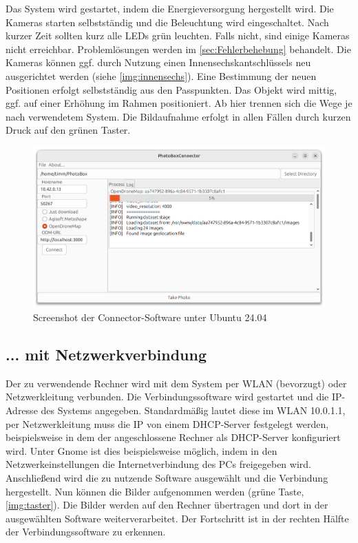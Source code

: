 \documentclass[./00PhotoBox.tex]{subfiles}
\begin{document}
Das System wird gestartet, indem die Energieversorgung hergestellt wird. Die Kameras starten selbstständig und die Beleuchtung wird eingeschaltet. Nach kurzer Zeit sollten kurz alle LEDs grün leuchten. Falls nicht, sind einige Kameras nicht erreichbar. Problemlösungen werden im \autoref{sec:Fehlerbehebung} behandelt. Die Kameras können ggf. durch Nutzung einen Innensechskantschlüssels neu ausgerichtet werden (siehe \autoref{img:innensechs}). Eine Bestimmung der neuen Positionen erfolgt selbstständig aus den Passpunkten. Das Objekt wird mittig, ggf. auf einer Erhöhung im Rahmen positioniert. Ab hier trennen sich die Wege je nach verwendetem System. Die Bildaufnahme erfolgt in allen Fällen durch kurzen Druck auf den grünen Taster.

\begin{figure}[htbp]
    \centering
    \includegraphics[width=1\textwidth]{./img/5_software/connector_screenshot.png}
    \caption{Screenshot der Connector-Software unter Ubuntu 24.04}
    \label{img:connector}
\end{figure}

\subsection{... mit Netzwerkverbindung}
Der zu verwendende Rechner wird mit dem System per WLAN (bevorzugt) oder Netzwerkleitung verbunden. Die Verbindungssoftware wird gestartet und die IP-Adresse des Systems angegeben. Standardmäßig lautet diese im WLAN 10.0.1.1, per Netzwerkleitung muss die IP von einem DHCP-Server festgelegt werden, beispielsweise in dem der angeschlossene Rechner als DHCP-Server konfiguriert wird. Unter Gnome ist dies beispielsweise möglich, indem in den Netzwerkeinstellungen die Internetverbindung des PCs freigegeben wird.
Anschließend wird die zu nutzende Software ausgewählt und die Verbindung hergestellt.
Nun können die Bilder aufgenommen werden (grüne Taste, \autoref{img:taster}). Die Bilder werden auf den Rechner übertragen und dort in der ausgewählten Software weiterverarbeitet. Der Fortschritt ist in der rechten Hälfte der Verbindungssoftware zu erkennen.
\end{document}
